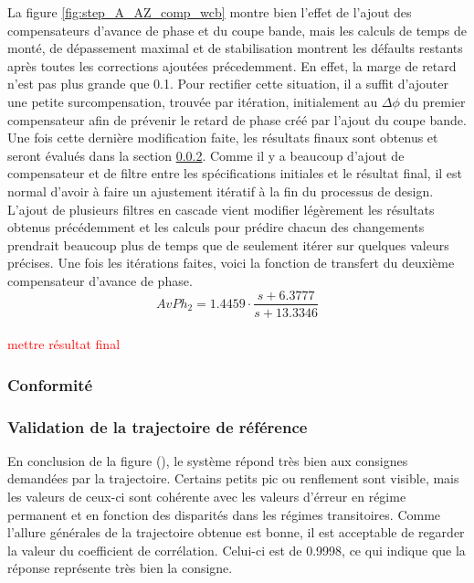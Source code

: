 \documentclass{udes_rapport} %
\begin{document}
La figure \ref{fig:step_A_AZ_comp_wcb} montre bien l'effet de l'ajout des compensateurs d'avance de phase et du coupe bande, mais les calculs de temps de monté, de dépassement maximal et de stabilisation montrent les défaults restants après toutes les corrections ajoutées précedemment. En effet, la marge de retard n'est pas plus grande que 0.1. Pour rectifier cette situation, il a suffit d'ajouter une petite surcompensation, trouvée par itération, initialement au $\Delta \phi$ du premier compensateur afin de prévenir le retard de phase créé par l'ajout du coupe bande. Une fois cette dernière modification faite, les résultats finaux sont obtenus et seront évalués dans la section \ref{valid_AZ_A}. Comme il y a beaucoup d'ajout de compensateur et de filtre entre les spécifications initiales et le résultat final, il est normal d'avoir à faire un ajustement itératif à la fin du processus de design. L'ajout de plusieurs filtres en cascade vient modifier légèrement les résultats obtenus précédemment et les calculs pour prédire chacun des changements prendrait beaucoup plus de temps que de seulement itérer sur quelques valeurs précises. Une fois les itérations faites, voici la fonction de transfert du deuxième compensateur d'avance de phase.
\[ AvPh_2 =  1.4459 \cdot \frac{s+6.3777}{s+13.3346}\]
\\
\textcolor{red}{mettre résultat final}
\\
\subsubsection{Conformité}
\subsubsection{Validation de la trajectoire de référence} \label{valid_AZ_A}
En conclusion de la figure (), le système répond très bien aux consignes demandées par la trajectoire. Certains petits pic ou renflement sont visible, mais les valeurs de ceux-ci sont cohérente avec les valeurs d'érreur en régime permanent et en fonction des disparités dans les régimes transitoires. Comme l'allure générales de la trajectoire obtenue est bonne, il est acceptable de regarder la valeur du coefficient de corrélation. Celui-ci est de 0.9998, ce qui indique que la réponse représente très bien la consigne.
\end{document}
